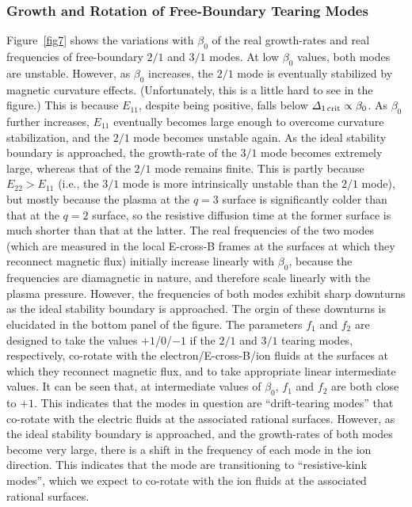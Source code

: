 \documentclass[12pt,prb,aps]{revtex4-1}
\begin{document}
\subsubsection{Growth and Rotation of Free-Boundary Tearing Modes}
Figure~\ref{fig7} shows the variations  with $\beta_0$ of the real growth-rates and real frequencies of free-boundary $2/1$ and $3/1$  modes.  At low $\beta_0$ values, both modes are
unstable. However, as $\beta_0$ increases, the $2/1$ mode is eventually stabilized by
magnetic curvature effects. (Unfortunately, this is a little hard to see in the figure.) This is because $E_{11}$, despite being positive, falls below ${\mit\Delta}_{1\,{\rm crit}}\propto\beta_0$.  As $\beta_0$ further increases, 
$E_{11}$ eventually becomes  large enough to overcome curvature stabilization, and the $2/1$ mode becomes unstable again. As the ideal stability
boundary is approached, the growth-rate of the $3/1$ mode becomes extremely large, whereas that of the $2/1$ mode remains finite. 
This is partly because $E_{22}>E_{11}$ (i.e., the $3/1$ mode is more intrinsically unstable than the $2/1$ mode), but mostly because
the plasma at the $q=3$ surface is significantly colder than that at the $q=2$ surface, so the resistive diffusion time at the former surface is much  shorter than
that at the latter. The real frequencies of the two modes (which are measured in the local E-cross-B frames at the surfaces at which they reconnect magnetic flux) initially increase linearly with $\beta_0$, because the frequencies are diamagnetic in nature, and therefore scale linearly with the plasma
pressure.\cite{ara} However, the frequencies of both modes exhibit sharp downturns as the ideal stability boundary is approached. The orgin
of these downturns is elucidated  in the bottom panel of the figure. The parameters $f_1$ and $f_2$ are designed to take the values $+1$/0/$-1$ if the $2/1$ and
$3/1$ tearing modes, respectively,  co-rotate with the
electron/E-cross-B/ion fluids at the surfaces at which they reconnect magnetic flux,  and to take appropriate linear intermediate values. It can be seen that, 
at intermediate values of $\beta_0$,  $f_1$ and $f_2$ are both close to $+1$. This indicates that the modes in question are ``drift-tearing modes'' that co-rotate
with the electric fluids at the associated rational surfaces.\cite{ara} However, as the ideal stability boundary is approached, and the growth-rates of
both modes become very large, there is a shift in the frequency of each mode in the ion direction. This indicates that the mode are transitioning to
``resistive-kink modes'', which we expect to co-rotate with the ion fluids at the associated rational surfaces.\cite{ara}
\end{document}

